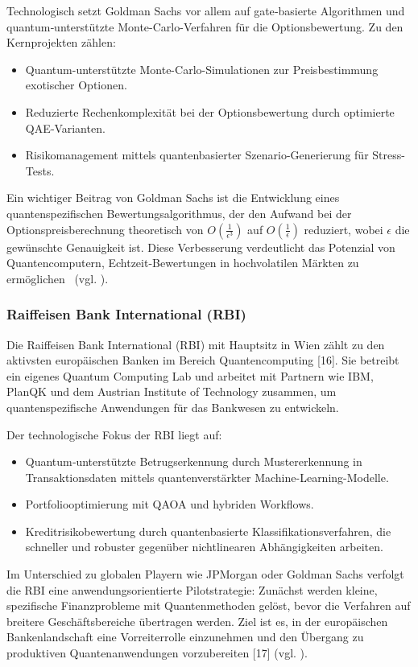 Technologisch setzt Goldman Sachs vor allem auf gate‑basierte Algorithmen und quantum‑unterstützte Monte-Carlo-Verfahren für die Optionsbewertung.
Zu den Kernprojekten zählen:
\begin{itemize}
\item Quantum-unterstützte Monte-Carlo-Simulationen zur Preisbestimmung exotischer Optionen.
\item Reduzierte Rechenkomplexität bei der Optionsbewertung durch optimierte QAE‑Varianten.
\item Risikomanagement mittels quantenbasierter Szenario-Generierung für Stress-Tests.
\end{itemize}
Ein wichtiger Beitrag von Goldman Sachs ist die Entwicklung eines quantenspezifischen Bewertungsalgorithmus, 
der den Aufwand bei der Optionspreisberechnung theoretisch von 
$O\!\left(\frac{1}{\epsilon^3}\right)$ auf $O\!\left(\frac{1}{\epsilon}\right)$ 
reduziert, wobei $\epsilon$ die gewünschte Genauigkeit ist. 
Diese Verbesserung verdeutlicht das Potenzial von Quantencomputern, 
Echtzeit-Bewertungen in hochvolatilen Märkten zu ermöglichen~\cite{15} (vgl. \cite{brandhofer_benchmarking_2022}).


\subsubsection*{Raiffeisen Bank International (RBI)}
Die Raiffeisen Bank International (RBI) mit Hauptsitz in Wien zählt zu den aktivsten europäischen Banken im Bereich Quantencomputing [16].
Sie betreibt ein eigenes Quantum Computing Lab und arbeitet mit Partnern wie IBM, PlanQK und dem Austrian Institute of Technology zusammen, um quantenspezifische Anwendungen für das Bankwesen zu entwickeln.

Der technologische Fokus der RBI liegt auf:
\begin{itemize}
\item Quantum‑unterstützte Betrugserkennung durch Mustererkennung in Transaktionsdaten mittels quantenverstärkter Machine-Learning-Modelle.
\item Portfoliooptimierung mit QAOA und hybriden Workflows.
\item Kreditrisikobewertung durch quantenbasierte Klassifikationsverfahren, die schneller und robuster gegenüber nichtlinearen Abhängigkeiten arbeiten.
\end{itemize}

Im Unterschied zu globalen Playern wie JPMorgan oder Goldman Sachs verfolgt die RBI eine anwendungsorientierte Pilotstrategie:
Zunächst werden kleine, spezifische Finanzprobleme mit Quantenmethoden gelöst, bevor die Verfahren auf breitere Geschäftsbereiche übertragen werden. Ziel ist es, in der europäischen Bankenlandschaft eine Vorreiterrolle einzunehmen und den Übergang zu produktiven Quantenanwendungen vorzubereiten [17] (vgl. \cite{brandhofer_benchmarking_2022}).

